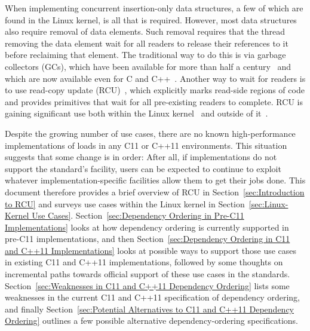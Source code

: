 \documentclass[letterpaper,twocolumn,10pt]{article}
\begin{document}
When implementing concurrent insertion-only data structures, a few of which are
found in the Linux kernel, 
 is all that is required.
However, most data structures also require removal of data elements.
Such removal requires that the thread removing the data element wait for all
readers to release their references to it before reclaiming that element.
The traditional way to do this is via garbage collectors (GCs), which
have been available for more than half a
century~\cite{McCarthy:1960:RFS:367177.367199}
and which are now available even for
C and C++~\cite{Boehm:2004:SEC:989393.989442}.
Another way to wait for readers is to use read-copy update
(RCU)~\cite{McKenney:2013:SDS:2483852.2483867,McKenney98},
which explicitly marks read-side regions of code and provides
primitives that wait for all pre-existing readers to complete.
RCU is gaining significant use both within the
Linux kernel~\cite{PaulEMcKenneyRCUusageRawDataPage}
and outside of it~\cite{MikeDay2013RCUqemu,MichaelDaltonPhD2009,MathieuDesnoyers2012URCU,HariKannan2009DynamicAnalysisRCU,GuillermoVigueras2012RCUCrowd}.

Despite the growing number of  use cases,
there are no known high-performance implementations of
 loads in any C11 or C++11 environments.
This situation suggests that some change is in order:  After all, if
implementations do not support the standard's 
facility, users
can be expected to continue to exploit whatever implementation-specific
facilities allow them to get their jobs done.
This document therefore provides a brief overview of RCU in
Section~\ref{sec:Introduction to RCU}
and surveys  use cases
within the Linux kernel in
Section~\ref{sec:Linux-Kernel Use Cases}.
Section~\ref{sec:Dependency Ordering in Pre-C11 Implementations}
looks at how dependency ordering is currently supported in
pre-C11 implementations,
and then
Section~\ref{sec:Dependency Ordering in C11 and C++11 Implementations}
looks at possible ways to
support those use cases in existing C11 and C++11 implementations,
followed by some thoughts on incremental paths towards official support
of these use cases in the standards.
Section~\ref{sec:Weaknesses in C11 and C++11 Dependency Ordering}
lists some weaknesses in the current C11 and C++11 specification
of dependency ordering, and finally
Section~\ref{sec:Potential Alternatives to C11 and C++11 Dependency Ordering}
outlines a few possible alternative dependency-ordering specifications.
\end{document}
